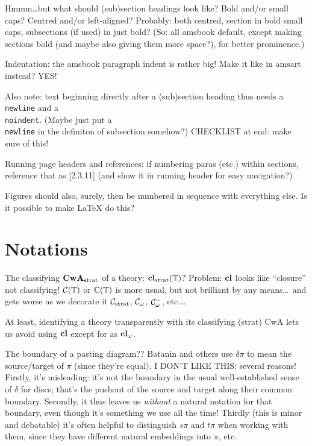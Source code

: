 \documentclass{amsart}
\begin{document}
Hmmm\ldots but what should (sub)section headings look like?  Bold and/or small caps?  Centred and/or left-aligned?  Probably: both centred, section in bold small caps, subsections (if used) in just bold?  (So: all amsbook default, except making sections bold (and maybe also giving them more space?), for better prominence.)

Indentation: the amsbook paragraph indent is rather big!  Make it like in amsart instead?  YES!

Also note: text beginning directly after a (sub)section heading thus needs a \texttt{\\newline} and a \texttt{\\noindent}.  (Maybe just put a \texttt{\\newline} in the definiton of subsection somehow?)  CHECKLIST at end: make sure of this!

Running page headers and references: if numbering paras (etc.) within sections,  reference that as [2.3.11] (and show it in running header for easy navigation?)

\para Figures should also, surely, then be numbered in sequence with everything else.  Is it possible to make \LaTeX{} do this?

\section{Notations}
\para The classifying $\mathbf{CwA}_{\textrm{strat}}$ of a theory: $\mathbf{cl}_{\textrm{strat}}(\mathbb{T})$?  Problem: $\mathbf{cl}$ looks like ``closure'' not classifying!  $\mathcal{C}(\mathbb{T})$ or $\mathbb{C}(\mathbb{T})$ is more usual, but not brilliant by any means\ldots\ and gets worse as we decorate it $\mathcal{C}_{\textrm{strat}}$, $\mathcal{C}_\omega$, $\mathcal{C}^-_\omega$, etc.\ldots

At least, identifying a theory transparently with its classifying (strat) CwA lets us avoid using $\mathbf{cl}$ except for as $\mathbf{cl}_\omega$.  

\para The boundary of a pasting diagram??  Batanin and others use $\delta \pi$ to mean the source/target of $\pi$ (since they're equal).  I DON'T LIKE THIS: several reasons!  Firstly, it's misleading: it's not the boundary in the usual well-established sense of $\delta$ for discs; that's the pushout of the source and target along their common boundary.  Secondly, it thus leaves us \emph{without} a natural notation for that boundary, even though it's something we use all the time!  Thirdly (this is minor and debatable) it's often helpful to distinguish $s\pi$ and $t\pi$ when working with them, since they have different natural embeddings into $\pi$, etc.
\end{document}
